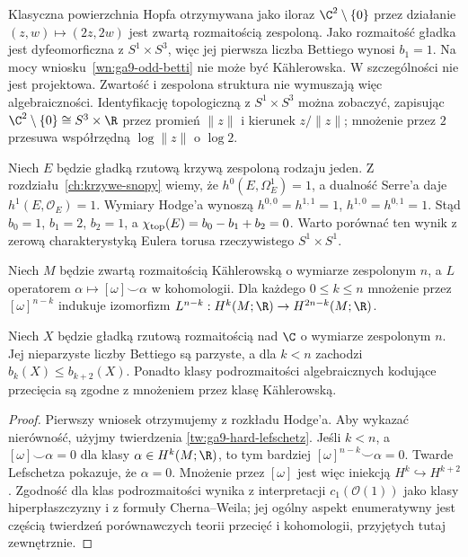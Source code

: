\begin{przyklad}
Klasyczna powierzchnia Hopfa otrzymywana jako iloraz
$\C^2\setminus\{0\}$ przez działanie
$(z,w)\mapsto(2z,2w)$ jest zwartą rozmaitością zespoloną.
Jako rozmaitość gładka jest dyfeomorficzna z
$S^1\times S^3$, więc jej pierwsza liczba Bettiego
wynosi $b_1=1$. Na mocy
wniosku~\ref{wn:ga9-odd-betti} nie może być Kählerowska.
W szczególności nie jest projektowa. Zwartość
i zespolona struktura nie wymuszają więc algebraiczności.
Identyfikację topologiczną z $S^1\times S^3$
można zobaczyć, zapisując $\C^2\setminus\{0\}
\cong S^3\times\R$ przez promień $\|z\|$ i kierunek
$z/\|z\|$; mnożenie przez $2$ przesuwa współrzędną
$\log\|z\|$ o $\log2$.
\end{przyklad}

\begin{przyklad}
Niech $E$ będzie gładką rzutową krzywą zespoloną
rodzaju jeden. Z rozdziału~\ref{ch:krzywe-snopy}
wiemy, że $h^0(E,\Omega_E^1)=1$, a dualność
Serre'a daje $h^1(E,\mathcal O_E)=1$.
Wymiary Hodge'a wynoszą
$h^{0,0}=h^{1,1}=1$, $h^{1,0}=h^{0,1}=1$.
Stąd $b_0=1$, $b_1=2$, $b_2=1$, a
$\chi_{\rm top}(E)=b_0-b_1+b_2=0$.
Warto porównać ten wynik z zerową charakterystyką
Eulera torusa rzeczywistego $S^1\times S^1$.
\end{przyklad}

\begin{twierdzenie}
\label{tw:ga9-hard-lefschetz}
Niech $M$ będzie zwartą rozmaitością Kählerowską
o wymiarze zespolonym $n$, a $L$ operatorem
$\alpha\mapsto[\omega]\smile\alpha$ w kohomologii.
Dla każdego $0\le k\le n$ mnożenie przez
$[\omega]^{n-k}$ indukuje izomorfizm
$L^{n-k}:H^k(M;\R)\to H^{2n-k}(M;\R)$.
\end{twierdzenie}

\begin{wniosek}
Niech $X$ będzie gładką rzutową rozmaitością nad $\C$
o wymiarze zespolonym $n$. Jej nieparzyste liczby
Bettiego są parzyste, a dla $k<n$ zachodzi
$b_k(X)\le b_{k+2}(X)$. Ponadto klasy podrozmaitości
algebraicznych kodujące przecięcia są zgodne z
mnożeniem przez klasę Kählerowską.
\end{wniosek}
\begin{proof}
Pierwszy wniosek otrzymujemy z rozkładu Hodge'a.
Aby wykazać nierówność, użyjmy twierdzenia
\ref{tw:ga9-hard-lefschetz}. Jeśli $k<n$, a
$[\omega]\smile\alpha=0$ dla klasy
$\alpha\in H^k(M;\R)$, to tym bardziej
$[\omega]^{n-k}\smile\alpha=0$. Twarde Lefschetza
pokazuje, że $\alpha=0$. Mnożenie przez $[\omega]$
jest więc iniekcją $H^k\hookrightarrow H^{k+2}$.
Zgodność dla klas podrozmaitości wynika z
interpretacji $c_1(\mathcal O(1))$ jako klasy
hiperpłaszczyzny i z formuły Cherna--Weila;
jej ogólny aspekt enumeratywny jest częścią
twierdzeń porównawczych teorii przecięć i
kohomologii, przyjętych tutaj zewnętrznie.
\end{proof}

